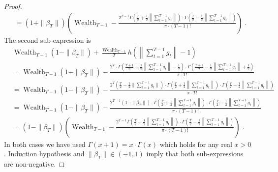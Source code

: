 \documentclass{article}
\DeclareMathOperator{\Wealth}{Wealth}
\begin{document}
\begin{proof}
\begin{align*}
& =  (1 + \|\beta_T\|) \left( \Wealth_{T-1} - \frac{2^{T-1} \Gamma \left(\frac{T}{2} + \frac{1}{2}\left\|\sum_{t=1}^{T-1} g_t \right\| \right) \cdot \Gamma \left(\frac{T}{2} - \frac{1}{2} \left\|\sum_{t=1}^{T-1} g_t \right\| \right)}{\pi \cdot (T-1)!} \right) \; .
\end{align*}
The second sub-expression is
\begin{align*}
& \Wealth_{T-1} (1 - \| \beta_T \|) + \frac{\Wealth_{T-1}}{T} h\left(\left\|\sum_{t=1}^{T-1} g_t \right\| - 1 \right) \\
& = \Wealth_{T-1} (1 - \|\beta_T\|) - \frac{2^T \cdot \Gamma \left(\frac{T+1}{2} + \frac{1}{2}\left\|\sum_{t=1}^{T-1} g_t \right\| - \frac{1}{2} \right) \cdot \Gamma \left(\frac{T+1}{2} - \frac{1}{2} \left\|\sum_{t=1}^{T-1} g_t \right\| + \frac{1}{2} \right)}{\pi \cdot T!} \\
& = \Wealth_{T-1} (1 - \|\beta_T\|) - \frac{2^T \left( \frac{T}{2} - \frac{1}{2}\|\sum_{t=1}^{T-1} g_t\| \right) \cdot \Gamma \left(\frac{T}{2} + \frac{1}{2}\left\|\sum_{t=1}^{T-1} g_t \right\| \right) \cdot \Gamma \left(\frac{T}{2} - \frac{1}{2} \left\|\sum_{t=1}^{T-1} g_t \right\| \right)}{\pi \cdot T!} \\
& = \Wealth_{T-1} (1 - \|\beta_T\|) - \frac{2^{T-1} \left( 1 - \|\beta_T\| \right) \cdot \Gamma \left(\frac{T}{2} + \frac{1}{2}\left\|\sum_{t=1}^{T-1} g_t \right\| \right) \cdot \Gamma \left(\frac{T}{2} - \frac{1}{2} \left\|\sum_{t=1}^{T-1} g_t \right\| \right)}{\pi \cdot (T-1)!} \\
& = (1 - \|\beta_T\|) \left( \Wealth_{T-1}  - \frac{2^{T-1} \Gamma \left(\frac{T}{2} + \frac{1}{2}\left\|\sum_{t=1}^{T-1} g_t \right\| \right) \cdot \Gamma \left(\frac{T}{2} - \frac{1}{2} \left\|\sum_{t=1}^{T-1} g_t \right\| \right)}{\pi \cdot (T-1)!} \right) \; .
\end{align*}
In both cases we have used $\Gamma(x+1) = x \cdot \Gamma(x)$ which holds for any
real $x > 0$. Induction hypothesis and $\|\beta_T\| \in (-1,1)$ imply
that both sub-expressions are non-negative.
\end{proof}
\end{document}
